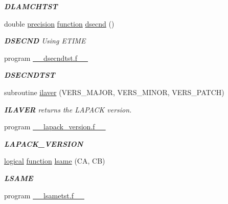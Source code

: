 \begin{DoxyCompactItemize}
\begin{DoxyCompactList}\small\item\em {\bfseries D\+L\+A\+M\+C\+H\+T\+S\+T} \end{DoxyCompactList}\item 
double \hyperlink{numinquire_8h_a2c8e616467665d0b2814d4c1589ba74e}{precision} \hyperlink{afunc_8m_a7b5e596df91eadea6c537c0825e894a7}{function} \hyperlink{group__auxOTHERauxiliary_gafe21a6b76340ac0afd7f0f84326e7918}{dsecnd} ()
\begin{DoxyCompactList}\small\item\em {\bfseries D\+S\+E\+C\+N\+D} Using E\+T\+I\+M\+E \end{DoxyCompactList}\item 
program \hyperlink{group__auxOTHERauxiliary_ga00e549b45eabbe138df540cf0f954ec6}{\+\_\+\+\_\+dsecndtst.\+f\+\_\+\+\_\+}
\begin{DoxyCompactList}\small\item\em {\bfseries D\+S\+E\+C\+N\+D\+T\+S\+T} \end{DoxyCompactList}\item 
subroutine \hyperlink{group__auxOTHERauxiliary_gace0eea943fa875e927d0b8b6614c9763}{ilaver} (V\+E\+R\+S\+\_\+\+M\+A\+J\+O\+R, V\+E\+R\+S\+\_\+\+M\+I\+N\+O\+R, V\+E\+R\+S\+\_\+\+P\+A\+T\+C\+H)
\begin{DoxyCompactList}\small\item\em {\bfseries I\+L\+A\+V\+E\+R} returns the L\+A\+P\+A\+C\+K version. \end{DoxyCompactList}\item 
program \hyperlink{group__auxOTHERauxiliary_gab9662e1df88fb8f65d7f42edcc6f4dda}{\+\_\+\+\_\+lapack\+\_\+version.\+f\+\_\+\+\_\+}
\begin{DoxyCompactList}\small\item\em {\bfseries L\+A\+P\+A\+C\+K\+\_\+\+V\+E\+R\+S\+I\+O\+N} \end{DoxyCompactList}\item 
\hyperlink{tnc_8c_aa7b64cdf39500931f7b333343791a104}{logical} \hyperlink{afunc_8m_a7b5e596df91eadea6c537c0825e894a7}{function} \hyperlink{group__auxOTHERauxiliary_gada799b40a93f1fd2c6d1a86a95f21631}{lsame} (C\+A, C\+B)
\begin{DoxyCompactList}\small\item\em {\bfseries L\+S\+A\+M\+E} \end{DoxyCompactList}\item 
program \hyperlink{group__auxOTHERauxiliary_gac14a642d1c4ae2713896577ae288bb58}{\+\_\+\+\_\+lsametst.\+f\+\_\+\+\_\+}

\end{DoxyCompactItemize}
